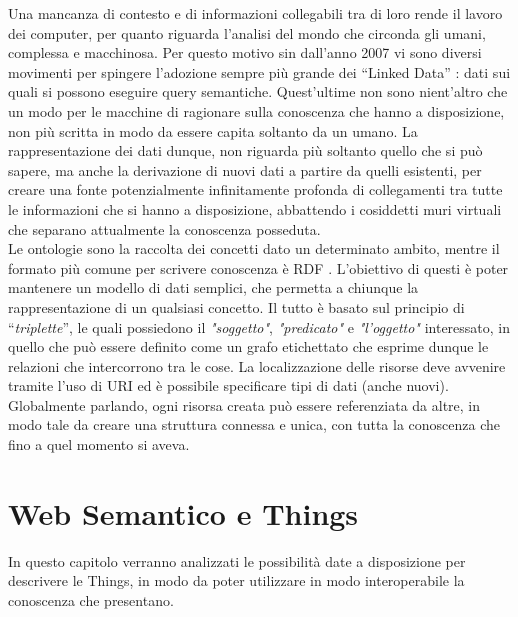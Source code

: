 \documentclass[12pt,a4paper,openright,oneside]{report}
\newcommand{\quotes}[1]{``#1''}
\begin{document}
Una mancanza di contesto e di informazioni collegabili tra di loro rende il lavoro dei computer, per quanto riguarda l'analisi del mondo che circonda gli umani, complessa e macchinosa. Per questo motivo sin dall'anno 2007 vi sono diversi movimenti per spingere l'adozione sempre più grande dei \quotes{Linked Data} \cite{linkeddata}: dati sui quali si possono eseguire query semantiche. Quest'ultime non sono nient'altro che un modo per le macchine di ragionare sulla conoscenza che hanno a disposizione, non più scritta in modo da essere capita soltanto da un umano. La rappresentazione dei dati dunque, non riguarda più soltanto quello che si può sapere, ma anche la derivazione di nuovi dati a partire da quelli esistenti, per creare una fonte potenzialmente infinitamente profonda di collegamenti tra tutte le informazioni che si hanno a disposizione, abbattendo i cosiddetti muri virtuali che separano attualmente la conoscenza posseduta.\\

Le ontologie \cite{ontology} sono la raccolta dei concetti dato un determinato ambito, mentre il formato più comune per scrivere conoscenza è RDF \cite{rdf}. L'obiettivo di questi è poter mantenere un modello di dati semplici, che permetta a chiunque la rappresentazione di un qualsiasi concetto. Il tutto è basato sul principio di \quotes{\textit{triplette}}, le quali possiedono il \textit{"soggetto"}, \textit{"predicato"} e \textit{"l'oggetto"} interessato, in quello che può essere definito come un grafo etichettato che esprime dunque le relazioni che intercorrono tra le cose. La localizzazione delle risorse deve avvenire tramite l'uso di URI ed è possibile specificare tipi di dati (anche nuovi). Globalmente parlando, ogni risorsa creata può essere referenziata da altre, in modo tale da creare una struttura connessa e unica, con tutta la conoscenza che fino a quel momento si aveva.


\clearpage{\pagestyle{empty}\cleardoublepage}
\chapter{Web Semantico e Things}           %
\lhead[\fancyplain{}{\bfseries\thepage}]{\fancyplain{}{\bfseries\rightmark}}  
In questo capitolo verranno analizzati le possibilità date a disposizione per descrivere le Things, in modo da poter utilizzare in modo interoperabile la conoscenza che presentano.
\end{document}
